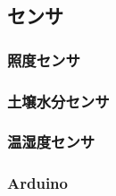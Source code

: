 \subsection{センサ}
\subsubsection{照度センサ}
\subsubsection{土壌水分センサ}

\subsubsection{温湿度センサ}
\subsubsection{Arduino}
